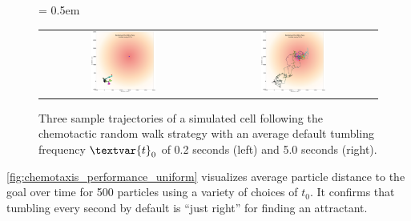 \begin{figure}[h]
\centering
\mySfFamily
\tabcolsep = 0.5em
\begin{tabular}{c c}
\includegraphics[width = 0.4\textwidth]{../images/chemotaxis_traj_0.2_uniform.png} & \includegraphics[width = 0.4\textwidth]{../images/chemotaxis_traj_5.0_uniform.png}
\end{tabular}
\caption{Three sample trajectories of a simulated cell following the chemotactic random walk strategy with an average default tumbling frequency $\textvar{t}_\text{0}$ of 0.2 seconds (left) and 5.0 seconds (right).}
\label{fig:chemotaxis_traj_low_high_tumbling}
\end{figure}

\autoref{fig:chemotaxis_performance_uniform} visualizes average particle distance to the goal over time for 500 particles using a variety of choices of $t_0$. It confirms that tumbling every second by default is ``just right'' for finding an attractant.\\

